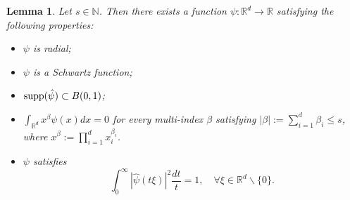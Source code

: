\documentclass[11pt]{article}
\newtheorem{lemma}[theorem]{Lemma}
\theoremstyle{remark}
\theoremstyle{example}
\theoremstyle{remark}
\newcommand{\N}{\mathbb{N}}
\newcommand{\R}{\mathbb{R}}
\begin{document}
\begin{lemma} \label{lemma:existence}
Let $s\in\N$. Then there exists a function $\psi: \R^d \to \R$ satisfying the following properties:%
\begin{itemize}
\item[(a)] $\psi$ is radial;%
\item[(b)] $\psi$ is a Schwartz function;%
\item[(c)] ${\rm supp}(\hat{\psi}) \subset B(0,1)$;%
\item[(d)] $\int_{\R^d} x^\beta \psi (x) dx = 0$ for every multi-index $\beta$ satisfying $| \beta | := \sum_{i=1}^d \beta_i \leq s$, where $x^\beta := \prod_{i=1}^d x_i^{\beta_i}$.%
\item[(e)] $\psi$ satisfies 
\begin{equation} \label{eq:Calderon_assump}
\int_0^\infty | \hat{\psi}(t \xi) |^2 \frac{dt}{t} = 1,\quad \forall \xi \in \R^d \backslash \{0\}.%
\end{equation}
\end{itemize} 
\end{lemma}
\end{document}

